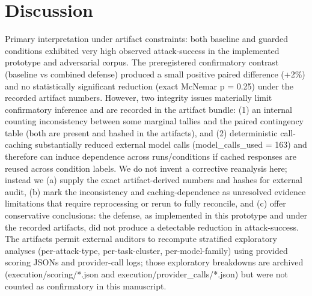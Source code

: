 \documentclass[conference]{IEEEtran}
\begin{document}
\section{Discussion}
Primary interpretation under artifact constraints: both baseline and guarded conditions exhibited very high observed attack-success in the implemented prototype and adversarial corpus. The preregistered confirmatory contrast (baseline vs combined defense) produced a small positive paired difference (+2\%) and no statistically significant reduction (exact McNemar p = 0.25) under the recorded artifact numbers. However, two integrity issues materially limit confirmatory inference and are recorded in the artifact bundle: (1) an internal counting inconsistency between some marginal tallies and the paired contingency table (both are present and hashed in the artifacts), and (2) deterministic call-caching substantially reduced external model calls (model\_calls\_used = 163) and therefore can induce dependence across runs/conditions if cached responses are reused across condition labels. We do not invent a corrective reanalysis here; instead we (a) supply the exact artifact-derived numbers and hashes for external audit, (b) mark the inconsistency and caching-dependence as unresolved evidence limitations that require reprocessing or rerun to fully reconcile, and (c) offer conservative conclusions: the defense, as implemented in this prototype and under the recorded artifacts, did not produce a detectable reduction in attack-success. The artifacts permit external auditors to recompute stratified exploratory analyses (per-attack-type, per-task-cluster, per-model-family) using provided scoring JSONs and provider-call logs; those exploratory breakdowns are archived (execution/scoring/*.json and execution/provider\_calls/*.json) but were not counted as confirmatory in this manuscript.
\end{document}

